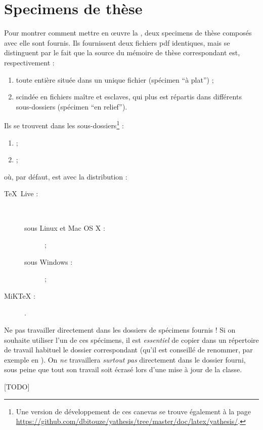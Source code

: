 \chapter{Specimens de thèse}\label{cha:specimen}

Pour montrer comment mettre en œuvre la \yatcl, deux specimens de thèse
composés avec elle sont fournis.  Ils fournissent deux fichiers \gls{pdf}
identiques, mais se distinguent par le fait que la source  du
mémoire de thèse correspondant est, respectivement :
\begin{enumerate}
\item toute entière située dans un unique fichier (spécimen \enquote{à plat}) ;
\item scindée en fichiers maître et esclaves, qui plus est répartis dans
  différents sous-dossiers (spécimen \enquote{en relief}).
\end{enumerate}
Ils se trouvent dans les sous-dossiers\footnote{Une version de
  développement de ces canevas se trouve également à la page
  \url{https://github.com/dbitouze/yathesis/tree/master/doc/latex/yathesis/}.} :
\begin{enumerate}
\item {} ;
\item {} ;
\end{enumerate}
où, par défaut,  est avec la distribution :
\begin{description}
\item[\TeX{}~Live :]\
  \begin{description}
  \item[sous Linux et Mac OS X :] \unixtldirectory\tldistdirectory\versiontl ;
  \item[sous Windows :] \wintldirectory\tldistdirectory\versiontl ;
  \end{description}
\item[MiK\TeX{} :] \miktexdistdirectory.
\end{description}

\begin{dbwarning}{Ne pas travailler directement dans les dossiers de spécimens
    fournis !}{}
  Si on souhaite utiliser l'un de ces spécimens, il est \emph{essentiel} de
  copier dans un répertoire de travail habituel le dossier correspondant (qu'il
  est conseillé de renommer, par exemple en \directory{these}). On \emph{ne}
  travaillera \emph{surtout pas} directement dans le dossier fourni, sous peine
  que tout son travail soit écrasé lors d'une mise à jour de la classe.
\end{dbwarning}


[TODO]

%
\iffalse
\fi
